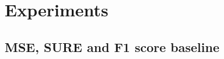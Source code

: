 
\section{Experiments}
\label{sec:experiments}









\subsection{MSE, SURE and F1 score baseline}

